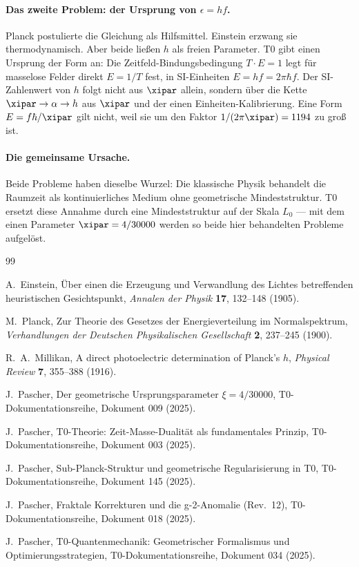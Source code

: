 \paragraph{Das zweite Problem: der Ursprung von $\epsilon = hf$.}
Planck postulierte die Gleichung als Hilfsmittel. Einstein erzwang sie thermodynamisch. 
Aber beide ließen $h$ als freien Parameter. T0 gibt einen Ursprung der Form an: Die
Zeitfeld-Bindungsbedingung $T \cdot E = 1$ legt für masselose Felder direkt
$E = 1/T$ fest, in SI-Einheiten $E = hf = 2\pi\hbar f$. Der SI-Zahlenwert von $h$ folgt
nicht aus $\xipar$ allein, sondern über die Kette $\xipar\to\alpha\to h$ aus $\xipar$ und der
einen Einheiten-Kalibrierung. Eine Form $E = f\hbar/\xipar$ gilt nicht, weil sie um den
Faktor $1/(2\pi\xipar) = 1194$ zu groß ist.

\paragraph{Die gemeinsame Ursache.}
Beide Probleme haben dieselbe Wurzel: Die klassische Physik behandelt die Raumzeit 
als kontinuierliches Medium ohne geometrische Mindeststruktur. T0 ersetzt diese 
Annahme durch eine Mindeststruktur auf der Skala $L_0$ — mit dem einen Parameter 
$\xipar = 4/30000$ werden so beide hier behandelten Probleme aufgelöst.

\begin{thebibliography}{99}

A.~Einstein,
\newblock Über einen die Erzeugung und Verwandlung des Lichtes betreffenden
heuristischen Gesichtspunkt,
\newblock \emph{Annalen der Physik} \textbf{17}, 132–148 (1905).

M.~Planck,
\newblock Zur Theorie des Gesetzes der Energieverteilung im Normalspektrum,
\newblock \emph{Verhandlungen der Deutschen Physikalischen Gesellschaft} \textbf{2}, 
237–245 (1900).

R.~A.~Millikan,
\newblock A direct photoelectric determination of Planck's $h$,
\newblock \emph{Physical Review} \textbf{7}, 355–388 (1916).

J.~Pascher,
\newblock Der geometrische Ursprungsparameter $\xi = 4/30000$,
\newblock T0-Dokumentationsreihe, Dokument 009 (2025).

J.~Pascher,
\newblock T0-Theorie: Zeit-Masse-Dualität als fundamentales Prinzip,
\newblock T0-Dokumentationsreihe, Dokument 003 (2025).

J.~Pascher,
\newblock Sub-Planck-Struktur und geometrische Regularisierung in T0,
\newblock T0-Dokumentationsreihe, Dokument 145 (2025).

J.~Pascher,
\newblock Fraktale Korrekturen und die g-2-Anomalie (Rev.\ 12),
\newblock T0-Dokumentationsreihe, Dokument 018 (2025).

J.~Pascher,
\newblock T0-Quantenmechanik: Geometrischer Formalismus und Optimierungsstrategien,
\newblock T0-Dokumentationsreihe, Dokument 034 (2025).

\end{thebibliography}
